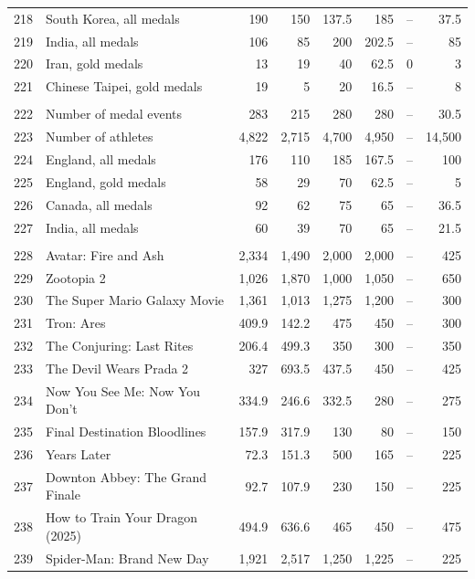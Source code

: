 \documentclass[11pt,a4paper]{article}
\begin{document}
{\begin{longtable}{@{}r>{\raggedright\arraybackslash}p{4.3cm}rrrrrr@{}}
218 & South Korea, all medals & 190 & 150 & 137.5 & 185 & -- & 37.5 \\
219 & India, all medals & 106 & 85 & 200 & 202.5 & -- & 85 \\
220 & Iran, gold medals & 13 & 19 & 40 & 62.5 & 0 & 3 \\
221 & Chinese Taipei, gold medals & 19 & 5 & 20 & 16.5 & -- & 8 \\
\addlinespace
\multicolumn{8}{@{}l}{\textit{Commonwealth Games}} \\
222 & Number of medal events & 283 & 215 & 280 & 280 & -- & 30.5 \\
223 & Number of athletes & 4,822 & 2,715 & 4,700 & 4,950 & -- & 14,500 \\
224 & England, all medals & 176 & 110 & 185 & 167.5 & -- & 100 \\
225 & England, gold medals & 58 & 29 & 70 & 62.5 & -- & 5 \\
226 & Canada, all medals & 92 & 62 & 75 & 65 & -- & 36.5 \\
227 & India, all medals & 60 & 39 & 70 & 65 & -- & 21.5 \\
\addlinespace
\multicolumn{8}{@{}l}{\textit{Films (million US dollars)}} \\
228 & Avatar: Fire and Ash & 2,334 & 1,490 & 2,000 & 2,000 & -- & 425 \\
229 & Zootopia 2 & 1,026 & 1,870 & 1,000 & 1,050 & -- & 650 \\
230 & The Super Mario Galaxy Movie & 1,361 & 1,013 & 1,275 & 1,200 & -- & 300 \\
231 & Tron: Ares & 409.9 & 142.2 & 475 & 450 & -- & 300 \\
232 & The Conjuring: Last Rites & 206.4 & 499.3 & 350 & 300 & -- & 350 \\
233 & The Devil Wears Prada 2 & 327 & 693.5 & 437.5 & 450 & -- & 425 \\
234 & Now You See Me: Now You Don't & 334.9 & 246.6 & 332.5 & 280 & -- & 275 \\
235 & Final Destination Bloodlines & 157.9 & 317.9 & 130 & 80 & -- & 150 \\
236 & 28 Years Later & 72.3 & 151.3 & 500 & 165 & -- & 225 \\
237 & Downton Abbey: The Grand Finale & 92.7 & 107.9 & 230 & 150 & -- & 225 \\
238 & How to Train Your Dragon (2025) & 494.9 & 636.6 & 465 & 450 & -- & 475 \\
239 & Spider-Man: Brand New Day & 1,921 & 2,517 & 1,250 & 1,225 & -- & 225 \\
\end{longtable}
}
\end{document}
